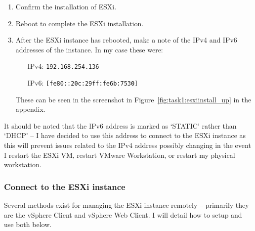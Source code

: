 \begin{enumerate}[resume*=task1methodology]
\begin{enumerate}[label=(\alph*)]
\begin{figure}[H]
          \label{fig:task1:esxiinstall_03}
        \end{figure}
      \item Confirm the installation of ESXi.
      \item Reboot to complete the ESXi installation.
      \item After the ESXi instance has rebooted, make a note of the IPv4 and IPv6 addresses of the instance. In my case these were:
      \begin{itemize}[leftmargin=1.5cm]
        \item [IPv4:] \texttt{192.168.254.136}
        \item [IPv6:] \texttt{[fe80::20c:29ff:fe6b:7530]}
      \end{itemize}
      These can be seen in the screenshot in Figure~\ref{fig:task1:esxiinstall_up} in the  appendix.
    \end{enumerate}
\end{enumerate}

\noindent It should be noted that the IPv6 address is marked as `STATIC' rather than `DHCP' -- I have decided to use this address to connect to the ESXi instance as this will prevent issues related to the IPv4 address possibly changing in the event I restart the ESXi VM, restart VMware Workstation, or restart my physical workstation.

\subsubsection{Connect to the ESXi instance}
Several methods exist for managing the ESXi instance remotely -- primarily they are the vSphere Client and vSphere Web Client. I will detail how to setup and use both below.

